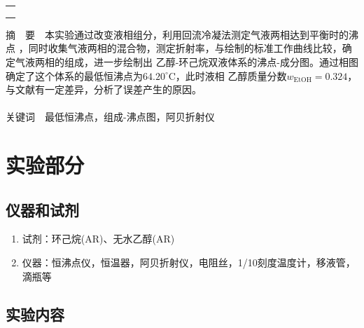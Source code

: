 \documentclass[12pt]{article}
\newcommand{\mr}[1]{\mathrm{#1}}
\def\celsius{^{\circ}\mr{C}}  %
\begin{document}
\begin{titlepage}
\begin{center}
            \begin{tabular*}{\textwidth}{c}
                \\ %
                \\ %
                \\ %
                \\ %
                \hline %
            \end{tabular*}
        \end{center}
        \textsf{摘\ \ 要}\ \ 本实验通过改变液相组分，利用回流冷凝法测定气液两相达到平衡时的沸点
		，同时收集气液两相的混合物，测定折射率，与绘制的标准工作曲线比较，确定气液两相的组成，进一步绘制出
		乙醇-环己烷双液体系的沸点-成分图。通过相图确定了这个体系的最低恒沸点为$64.20\celsius$，此时液相
		乙醇质量分数$w_{\mr{EtOH}}=0.324$，与文献有一定差异，分析了误差产生的原因。
        \\
        \\
        \textsf{关键词}\ \ 最低恒沸点，组成-沸点图，阿贝折射仪
    \end{titlepage}
	\vbox{}        
    \section{实验部分}
    	\subsection{仪器和试剂}
		\begin{enumerate}
			\item 试剂：环己烷(AR)、无水乙醇(AR)
			\item 仪器：恒沸点仪，恒温器，阿贝折射仪，电阻丝，1/10刻度温度计，移液管，滴瓶等
		\end{enumerate}
		\subsection{实验内容}
\end{document}

